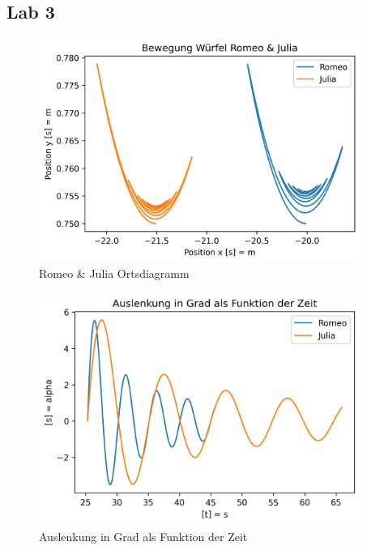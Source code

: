 \documentclass[../main.tex]{subfiles}
\begin{document}
    \subsection{Lab 3}


    \begin{figure}[H]
        \begin{center}
            \centerline{\includegraphics[width=105mm]{./images/ropeJulia/Ortdiagramm}}
            \caption{Romeo \& Julia Ortsdiagramm}
            \label{fig:RomeoJuliaOrtsdiagramm}
        \end{center}
    \end{figure}


    \begin{figure}[H]
        \begin{center}
            \centerline{\includegraphics[width=105mm]{./images/ropeJulia/AuslenkungDeg}}
            \caption{Auslenkung in Grad als Funktion der Zeit}
            \label{fig:Auslenkung}
        \end{center}
    \end{figure}
\end{document}
